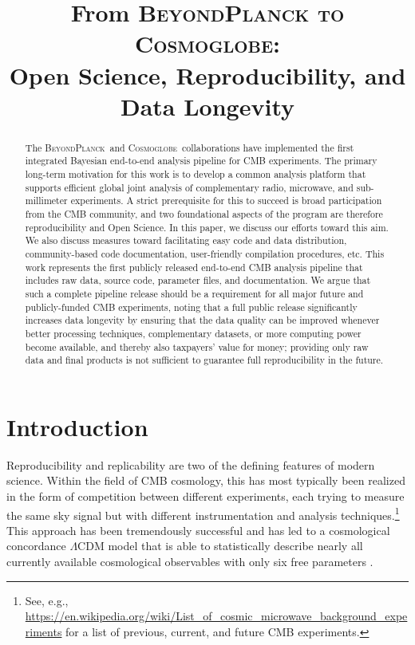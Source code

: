 \documentclass[twocolumn]{openjournal}
\newcommand{\BP}{\textsc{BeyondPlanck}}
\newcommand{\cosmoglobe}{\textsc{Cosmoglobe}}
\begin{document}
\title{\bfseries{From \scshape{BeyondPlanck} to \scshape{Cosmoglobe}:}\\
    Open Science, Reproducibility, and Data Longevity}



\begin{abstract}
  The \BP\ and \cosmoglobe\ collaborations have 
  implemented the first integrated Bayesian end-to-end analysis 
  pipeline for CMB experiments. The primary long-term motivation 
  for this work is to develop a common analysis platform that 
  supports efficient global joint analysis of complementary 
  radio, microwave, and sub-millimeter experiments. A strict 
  prerequisite for this to succeed is broad participation 
  from the CMB community, and two foundational aspects of the 
  program are therefore reproducibility and Open Science. 
  In this paper, we discuss our efforts toward this aim. We 
  also discuss measures toward facilitating easy code and data 
  distribution, community-based code documentation, user-friendly 
  compilation procedures, etc. This work represents the first 
  publicly released end-to-end CMB analysis pipeline that 
  includes raw data, source code, parameter files, and 
  documentation. We argue that such a complete pipeline 
  release should be a requirement for all major 
  future and publicly-funded CMB experiments, noting that 
  a full public release significantly increases data 
  longevity by ensuring that the data quality can be 
  improved whenever better processing techniques, complementary 
  datasets, or more computing power become available, and 
  thereby also taxpayers' value for money; providing only 
  raw data and final products is not sufficient to guarantee 
  full reproducibility in the future.
\end{abstract}




\section{Introduction}
\label{sec:introduction}

Reproducibility and replicability are two of the defining features of modern
science. Within the field of CMB cosmology, this has most typically been
realized in the form of competition between different experiments, each trying
to measure the same sky signal but with different instrumentation and analysis
techniques.\footnote{See, e.g.,
\url{https://en.wikipedia.org/wiki/List_of_cosmic_microwave_background_experiments}
for a list of previous, current, and future CMB experiments.} This approach has
been tremendously successful and has led to a cosmological concordance
$\Lambda$CDM model that is able to statistically describe nearly all currently
available cosmological observables with only six free parameters
\citep{planck2016-l06}.
\end{document}
